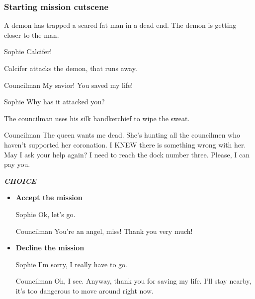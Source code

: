 \subsubsection*{Starting mission cutscene}
\begin{screenplay}

A demon has trapped a scared fat man in a dead end. The demon is getting closer to the man.

\begin{dialogue}{Sophie}
Calcifer!
\end{dialogue}

Calcifer attacks the demon, that runs away.

\begin{dialogue}[grateful]{Councilman}
My savior! You saved my life!
\end{dialogue}

\begin{dialogue}{Sophie}
Why has it attacked you?
\end{dialogue}

The councilman uses his silk handkerchief to wipe the sweat.

\begin{dialogue}{Councilman}
The queen wants me dead. She's hunting all the councilmen who haven't supported her coronation. I KNEW there is something wrong with her. May I ask your help again? I need to reach the dock number three. Please, I can pay you.
\end{dialogue}

\end{screenplay}

\textit{\textbf{CHOICE}}
\begin{itemize}
\item \textbf{Accept the mission}

\begin{screenplay}

\begin{dialogue}{Sophie}
Ok, let's go.
\end{dialogue}

\begin{dialogue}[grateful]{Councilman}
You're an angel, miss! Thank you very much!
\end{dialogue}

\end{screenplay}

\item \textbf{Decline the mission}

\begin{screenplay}

\begin{dialogue}{Sophie}
I'm sorry, I really have to go.
\end{dialogue}

\begin{dialogue}[disappointed]{Councilman}
Oh, I see. Anyway, thank you for saving my life. I'll stay nearby, it's too dangerous to move around right now.
\end{dialogue}

\end{screenplay}

\end{itemize}

